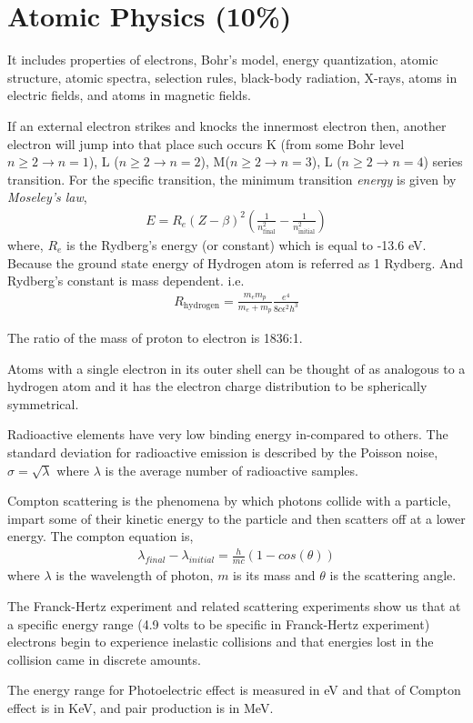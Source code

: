 
\section{Atomic Physics (10\%)}

It includes properties of electrons, Bohr's model, energy quantization, atomic structure, atomic spectra, selection rules, black-body radiation, X-rays, atoms in electric fields, and atoms in magnetic fields.

If an external electron strikes and knocks the innermost electron then, another electron will jump into that place such occurs K (from some Bohr level $n \geq 2 \to n = 1$), L ($n \geq 2 \to n = 2$), M($n \geq 2 \to n = 3$), L ($n \geq 2 \to n = 4$) series transition. For the specific transition, the minimum transition \emph{energy} is given by \emph{Moseley's law},
\begin{align}
E = R_{e} (Z - \beta)^{2} \left( \frac{1}{n_{\text{final}}^{2}} - \frac{1}{n_{\text{initial}}^{2}} \right)
\end{align}
where, $R_{e}$ is the Rydberg's energy (or constant) which is equal to -13.6 eV. Because the ground state energy of Hydrogen atom is referred as 1 Rydberg. And Rydberg's constant is mass dependent. i.e.
\begin{align*}
R_{\text{hydrogen}} = \frac{m_{e} m_{p}}{m_{e} + m_{p}} \frac{e^{4}}{8c\epsilon^{2} h^{3}}
\end{align*}

The ratio of the mass of proton to electron is 1836:1.

Atoms with a single electron in its outer shell can be thought of as analogous to a hydrogen atom and it has the electron charge distribution to be spherically symmetrical.

Radioactive elements have very low binding energy in-compared to others. The standard deviation for radioactive emission is described by the Poisson noise, $\sigma = \sqrt{\lambda}$ where $\lambda$ is the average number of radioactive samples. 

Compton scattering is the phenomena by which photons collide with a particle, impart some of their kinetic energy to the particle and then scatters off at a lower energy. The compton equation is,
\begin{align}
\lambda_{final} - \lambda_{initial} = \frac{h}{m c}(1 - cos(\theta))
\end{align}
where $\lambda$ is the wavelength of photon, $m$ is its mass and $\theta$ is the scattering angle.

The Franck-Hertz experiment and related scattering experiments show us that at a specific energy range (4.9 volts to be specific in Franck-Hertz experiment) electrons begin to experience inelastic collisions and that energies lost in the collision came in discrete amounts.

The energy range for Photoelectric effect is measured in eV and that of Compton effect is in KeV, and pair production is in MeV.